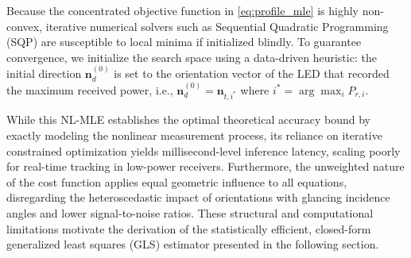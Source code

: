 \documentclass[journal]{IEEEtran}
\begin{document}
Because the concentrated objective function in \eqref{eq:profile_mle} is highly non-convex, iterative numerical solvers such as Sequential Quadratic Programming (SQP) are susceptible to local minima if initialized blindly. To guarantee convergence, we initialize the search space using a data-driven heuristic: the initial direction $\mathbf{n}_{d}^{(0)}$ is set to the orientation vector of the LED that recorded the maximum received power, i.e., $\mathbf{n}_{d}^{(0)} = \mathbf{n}_{t, i^*}$ where $i^* = \arg\max_i P_{r,i}$.

While this NL-MLE establishes the optimal theoretical accuracy bound by exactly modeling the nonlinear measurement process, its reliance on iterative constrained optimization yields millisecond-level inference latency, scaling poorly for real-time tracking in low-power receivers. Furthermore, the unweighted nature of the cost function applies equal geometric influence to all equations, disregarding the heteroscedastic impact of orientations with glancing incidence angles and lower signal-to-noise ratios. These structural and computational limitations motivate the derivation of the statistically efficient, closed-form generalized least squares (GLS) estimator presented in the following section.
\end{document}
